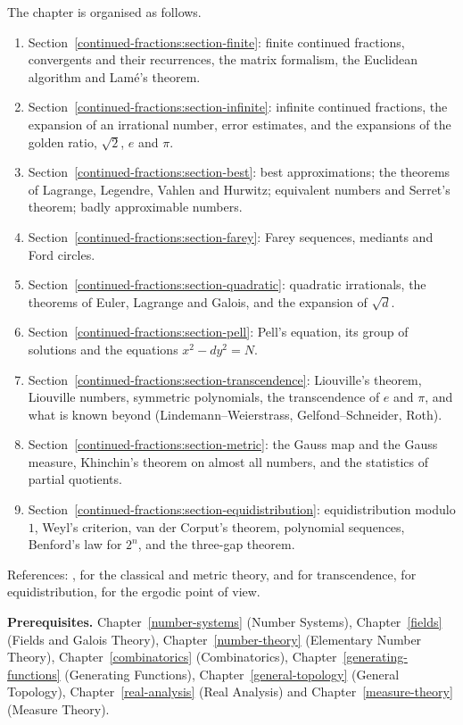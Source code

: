 The chapter is organised as follows.
\begin{enumerate}
\item Section~\ref{continued-fractions:section-finite}: finite continued fractions, convergents and their recurrences, the matrix formalism, the Euclidean algorithm and Lamé's theorem.
\item Section~\ref{continued-fractions:section-infinite}: infinite continued fractions, the expansion of an irrational number, error estimates, and the expansions of the golden ratio, $\sqrt2$,
$e$ and $\pi$.
\item Section~\ref{continued-fractions:section-best}: best approximations; the theorems of Lagrange, Legendre, Vahlen and Hurwitz; equivalent numbers and Serret's theorem; badly approximable
numbers.
\item Section~\ref{continued-fractions:section-farey}: Farey sequences, mediants and Ford circles.
\item Section~\ref{continued-fractions:section-quadratic}: quadratic irrationals, the theorems of Euler, Lagrange and Galois, and the expansion of $\sqrt d$.
\item Section~\ref{continued-fractions:section-pell}: Pell's equation, its group of solutions and the equations $x^2 - dy^2 = N$.
\item Section~\ref{continued-fractions:section-transcendence}: Liouville's theorem, Liouville numbers, symmetric polynomials, the transcendence of $e$ and $\pi$, and what is known beyond
(Lindemann--Weierstrass, Gelfond--Schneider, Roth).
\item Section~\ref{continued-fractions:section-metric}: the Gauss map and the Gauss measure, Khinchin's theorem on almost all numbers, and the statistics of partial quotients.
\item Section~\ref{continued-fractions:section-equidistribution}: equidistribution modulo $1$, Weyl's criterion, van der Corput's theorem, polynomial sequences, Benford's law for $2^n$, and the
three-gap theorem.
\end{enumerate}
References: \cite[Chapters III, X, XI]{hardy-wright}, \cite{khinchin-continued-fractions} for the classical and metric theory, \cite{baker-transcendental} and \cite{niven-irrational} for
transcendence, \cite{kuipers-niederreiter} for equidistribution, \cite{einsiedler-ward} for the ergodic point of view.

\noindent\textbf{Prerequisites.} Chapter~\ref{number-systems} (Number Systems), Chapter~\ref{fields} (Fields and Galois Theory), Chapter~\ref{number-theory} (Elementary Number Theory),
Chapter~\ref{combinatorics} (Combinatorics), Chapter~\ref{generating-functions} (Generating Functions), Chapter~\ref{general-topology} (General Topology), Chapter~\ref{real-analysis} (Real Analysis)
and Chapter~\ref{measure-theory} (Measure Theory).

